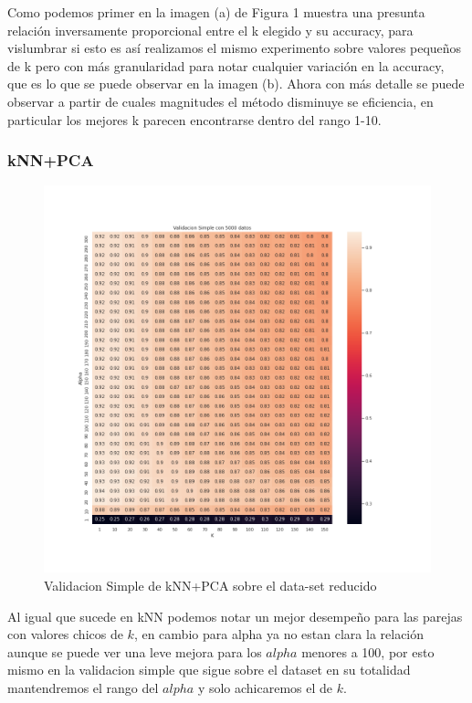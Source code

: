 \par

Como podemos primer en la imagen (a) de Figura 1 muestra una presunta relación inversamente proporcional entre el k elegido y su accuracy, para vislumbrar si esto es así realizamos el mismo experimento sobre valores pequeños de k pero con más granularidad para notar cualquier variación en la accuracy, que es lo que se puede observar en la imagen (b). Ahora con más detalle se puede observar a partir de cuales magnitudes el método disminuye se eficiencia, en particular los mejores k parecen encontrarse dentro del rango 1-10.

\subsubsection{kNN+PCA}

\begin{figure}[H]
    \centering
    \includegraphics[width=12cm]{images/validacionSimple_heatmap_datasetRedux}%
    \qquad
    \caption{Validacion Simple de kNN+PCA sobre el data-set reducido}
    \label{knnpca_preliminar}%
\end{figure}

Al igual que sucede en kNN podemos notar un mejor desempeño para las parejas con valores chicos de $k$, en cambio para alpha ya no estan clara la relación aunque se puede ver una leve mejora para los $alpha$ menores a 100, por esto mismo en la validacion simple que sigue sobre el dataset en su totalidad mantendremos el rango del $alpha$ y solo achicaremos el de $k$.

